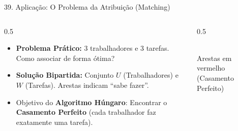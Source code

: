 \documentclass[9pt]{beamer}
\begin{document}
    \begin{frame}{39. Aplicação: O Problema da Atribuição (Matching)}
        \begin{columns}
            \begin{column}{0.5\textwidth}
                \begin{itemize}
                    \item \textbf{Problema Prático:} 3 trabalhadores e 3 tarefas. Como associar de forma ótima?
                    \item \textbf{Solução Bipartida:} Conjunto $U$ (Trabalhadores) e $W$ (Tarefas). Arestas indicam ``sabe fazer''.
                    \item Objetivo do \textbf{Algoritmo Húngaro}: Encontrar o \textbf{Casamento Perfeito} (cada trabalhador faz exatamente uma tarefa).
                \end{itemize}
            \end{column}
            \begin{column}{0.5\textwidth}
                \centering
                \\
                \vspace{0.2cm}
                \tiny Arestas em vermelho (Casamento Perfeito)
            \end{column}
        \end{columns}
    \end{frame}
\end{document}
